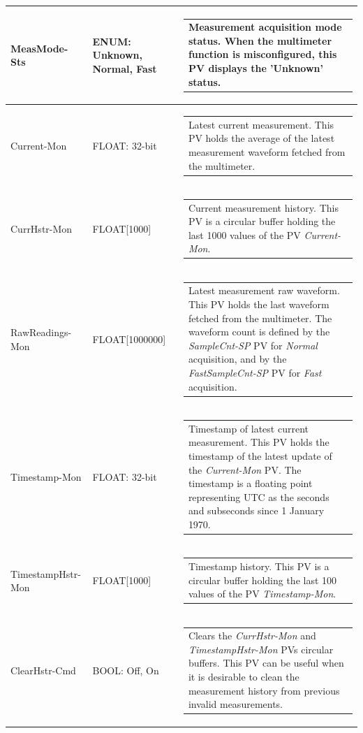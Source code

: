 \documentclass[openany]{article}
\begin{document}
\begin{longtable}{| m{3.0cm} m{4.5cm} m{7.0cm} |}
		MeasMode-Sts & ENUM: Unknown, Normal, Fast & \begin{tabular}{@{}m{6cm}@{}}
	    					Measurement acquisition mode status. When the multimeter function is misconfigured, this PV displays the 'Unknown' status.
						\end{tabular} \\ \hline
		Current-Mon & FLOAT: 32-bit & \begin{tabular}{@{}m{6cm}@{}}
	    					Latest current measurement. This PV holds the average of the latest measurement waveform fetched from the multimeter.
						\end{tabular} \\ \hline
		CurrHstr-Mon & FLOAT[1000] & \begin{tabular}{@{}m{6cm}@{}}
	    					Current measurement history. This PV is a circular buffer holding the last 1000 values of the PV \emph{Current-Mon}.
						\end{tabular} \\ \hline
		RawReadings-Mon & FLOAT[1000000] & \begin{tabular}{@{}m{6cm}@{}}
	    					Latest measurement raw waveform. This PV holds the last waveform fetched from the multimeter. The waveform count is defined by the \emph{SampleCnt-SP} PV for \emph{Normal} acquisition, and by the \emph{FastSampleCnt-SP} PV for \emph{Fast} acquisition.
						\end{tabular} \\ \hline
		Timestamp-Mon & FLOAT: 32-bit & \begin{tabular}{@{}m{6cm}@{}}
	    					Timestamp of latest current measurement. This PV holds the timestamp of the latest update of the \emph{Current-Mon} PV. The timestamp is a floating point representing UTC as the seconds and subseconds since 1 January 1970.
						\end{tabular} \\ \hline
		TimestampHstr-Mon & FLOAT[1000] & \begin{tabular}{@{}m{6cm}@{}}
	    					Timestamp history. This PV is a circular buffer holding the last 100 values of the PV \emph{Timestamp-Mon}.
						\end{tabular} \\ \hline
		ClearHstr-Cmd & BOOL: Off, On & \begin{tabular}{@{}m{6cm}@{}}
	    					Clears the \emph{CurrHstr-Mon} and \emph{TimestampHstr-Mon} PVs circular buffers. This PV can be useful when it is desirable to clean the measurement history from previous invalid measurements.

\end{tabular}
\end{longtable}
\end{document}

